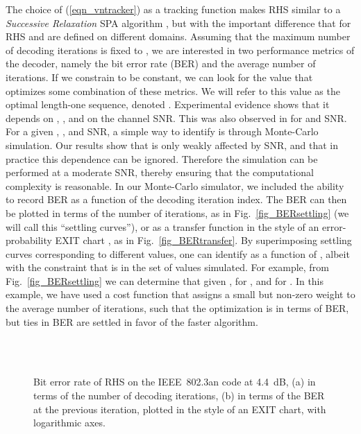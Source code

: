 \documentclass[12pt,journal,twoside,draftcls,onecolumn]{IEEEtran}
\begin{document}
The choice of (\ref{eqn_vntracker}) as a tracking function makes RHS similar to a \emph{Successive Relaxation} SPA algorithm \cite{hemati:2006a}, but with the important difference that for RHS  and  are defined on different domains.
Assuming that the maximum number of decoding iterations is fixed to , we are interested in two performance metrics of the decoder, namely the bit error rate (BER) and the average number of iterations.
If we constrain  to be constant, we can look for the value that optimizes some combination of these metrics. We will refer to this value as the optimal length-one  sequence, denoted . Experimental evidence shows that it depends on , , and on the channel SNR. This was also observed in \cite{hemati:2006a} for  and SNR.
For a given , , and SNR, a simple way to identify  is through Monte-Carlo simulation. Our results show that  is only weakly affected by SNR, and that in practice this dependence can be ignored. Therefore the simulation can be performed at a moderate SNR, thereby ensuring that the computational complexity is reasonable. 
In our Monte-Carlo simulator, we included the ability to record BER as a function of the decoding iteration index. The BER can then be plotted in terms of the number of iterations, as in Fig.~\ref{fig_BERsettling} (we will call this ``settling curves''), or as a transfer function in the style of an error-probability EXIT chart \cite{ardakani:2004}, as in Fig.~\ref{fig_BERtransfer}.
By superimposing settling curves corresponding to different  values, one can identify  as a function of , albeit with the constraint that  is in the set of  values simulated. 
For example, from Fig.~\ref{fig_BERsettling} we can determine that given ,  for , and  for . In this example, we have used a cost function that assigns a small but non-zero weight to the average number of iterations, such that the optimization is in terms of BER, but ties in BER are settled in favor of the faster algorithm.


	\begin{figure}[tbp]
	\begin{center}
\ifCLASSOPTIONdraftcls
	 \\
\else
	 \\
\fi
	\caption{Bit error rate of RHS on the IEEE~802.3an code \cite{djurdjevic:2003} at 4.4~dB, (a) in terms of the number of decoding iterations, (b) in terms of the BER at the previous iteration, plotted in the style of an EXIT chart, with logarithmic axes.} 
	\end{center}
	\end{figure}
\end{document}
